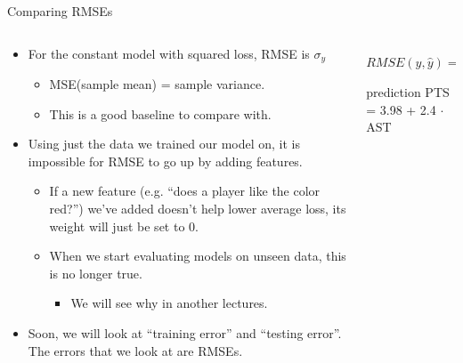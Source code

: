 \documentclass[aspectratio=169]{../latex_main/tntbeamer}  %
\begin{document}
	\begin{frame}{Comparing RMSEs}
	
	    \vspace{-2em}
	    \begin{columns}
	    
	        \begin{column}{.6\textwidth}
	        
	                \begin{itemize}
	                    \item For the constant model with squared loss, RMSE is  $\sigma_y$   
	                    \begin{itemize}
	                        \item MSE(sample mean) = sample variance.
	                        \item This is a good baseline to compare with.
	                    \end{itemize}
	                    \item Using just the data we trained our model on, it is impossible for RMSE to go up by adding features.
	                    \begin{itemize}
	                        \item If a new feature (e.g. “does a player like the color red?”) we’ve added doesn’t help lower average loss, its weight will just be set to 0.
	                        \item When we start evaluating models on unseen data, this is no longer true.
	                        \begin{itemize}
	                            \item We will see why in another lectures.
	                        \end{itemize}
	                    \end{itemize}
	                    \item Soon, we will look at “training error” and “testing error”. The errors that we look at are RMSEs.
	                \end{itemize}
	        \end{column}
	            
	        \begin{column}{.4\textwidth}
	        
	                \begin{equation*}
	                 RMSE(y,\hat{y}) = \sqrt{\frac{1}{n}\sum\limits_{i=1}^n(y_i - \hat{y}_i)^2}
	            \end{equation*}
	            prediction PTS = 3.98 + 2.4 $\cdot$ AST


\end{column}
\end{columns}
\end{frame}
\end{document}
